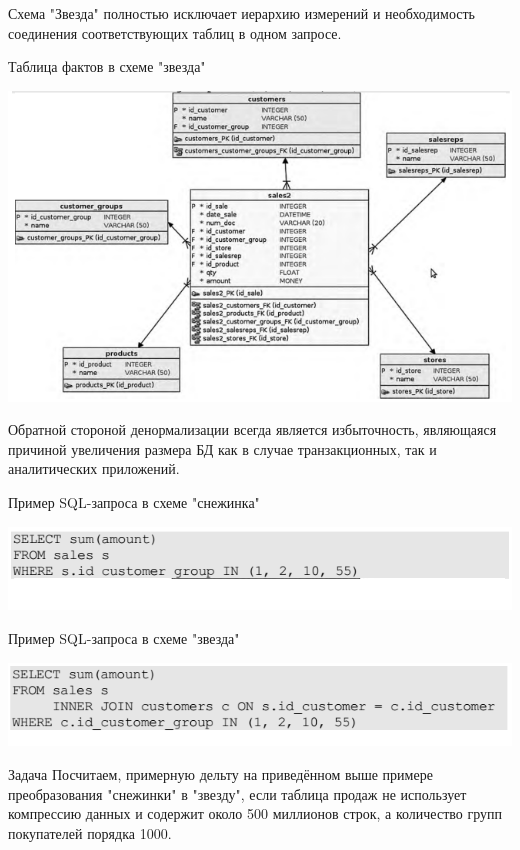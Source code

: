 \begin{frame}
Схема "Звезда" полностью исключает иерархию измерений и необходимость соединения соответствующих таблиц в одном запросе.
\begin{block}{Таблица фактов в схеме "звезда"}
\begin{center}
\includegraphics[scale=0.45]{images/star.png}
\end{center}
\end{block}
Обратной стороной денормализации всегда является избыточность, являющаяся причиной увеличения размера БД как в случае транзакционных, так и аналитических приложений.
\end{frame}


\begin{frame}
\begin{block}{Пример SQL-запроса в схеме "снежинка"}
\begin{center}
\includegraphics[scale=0.5]{images/star-sql.png}
\end{center}
\end{block}
\begin{block}{Пример SQL-запроса в схеме "звезда"}
\begin{center}
\includegraphics[scale=0.5]{images/snow-sql.png}
\end{center}
\end{block}
\begin{block}{Задача}
Посчитаем, примерную дельту на приведённом выше примере преобразования
"снежинки" в "звезду", если таблица продаж не использует компрессию данных и содержит
около 500 миллионов строк, а количество групп покупателей порядка 1000.
\end{block}
\end{frame}